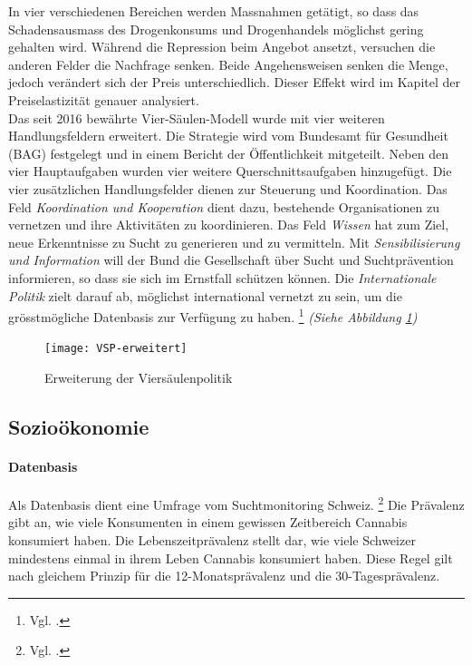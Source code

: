 \documentclass[../main.tex]{subfiles}
\begin{document}
  	\noindent
	In vier verschiedenen Bereichen werden Massnahmen getätigt, so dass das Schadensausmass des Drogenkonsums und Drogenhandels möglichst gering gehalten wird.
	Während die Repression beim Angebot ansetzt, versuchen die anderen Felder die Nachfrage senken.
	Beide Angehensweisen senken die Menge, jedoch verändert sich der Preis unterschiedlich. 
	Dieser Effekt wird im Kapitel der Preiselastizität genauer analysiert.\\
	
	\noindent
	Das seit 2016 bewährte Vier-Säulen-Modell wurde mit vier weiteren Handlungsfeldern erweitert. 
	Die Strategie wird vom Bundesamt für Gesundheit (BAG) festgelegt und in einem Bericht der Öffentlichkeit mitgeteilt.
	Neben den vier Hauptaufgaben wurden vier weitere Querschnittsaufgaben hinzugefügt.
	Die vier zusätzlichen Handlungsfelder dienen zur Steuerung und Koordination.
	Das Feld \textit{Koordination und Kooperation} dient dazu, bestehende Organisationen zu vernetzen und ihre Aktivitäten zu koordinieren.
	Das Feld \textit{Wissen} hat zum Ziel, neue Erkenntnisse zu Sucht zu generieren und zu vermitteln.
	Mit \textit{Sensibilisierung und Information} will der Bund die Gesellschaft über Sucht und Suchtprävention informieren, so dass sie sich im Ernstfall schützen können.
	Die \textit{Internationale Politik} zielt darauf ab, möglichst international vernetzt zu sein, um die grösstmögliche Datenbasis zur Verfügung zu haben.%
	\footnote{Vgl. \cite{bag-01}.}
	\textit{(Siehe Abbildung \ref{fig:vsp})}

	\noindent	 
	\begin{figure}[H]
		\centering
		\texttt{[image: VSP-erweitert]}
		\captionsetup{font=small}
		\caption[Erweiterung der Viersäulenpolitik]{Erweiterung der Viersäulenpolitik\protect\footnotemark}		
		\label{fig:vsp}
	\end{figure}
	
	\subsection{Sozioökonomie}
	
	\paragraph{Datenbasis}
	Als Datenbasis dient eine Umfrage vom Suchtmonitoring Schweiz.%
	\footnote{Vgl. \cite{gmel}.}
	Die Prävalenz gibt an, wie viele Konsumenten in einem gewissen Zeitbereich Cannabis konsumiert haben.
	Die Lebenszeitprävalenz stellt dar, wie viele Schweizer mindestens einmal in ihrem Leben Cannabis konsumiert haben.
	Diese Regel gilt nach gleichem Prinzip für die 12-Monatsprävalenz und die 30-Tagesprävalenz.
	
\end{document}
